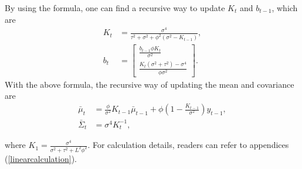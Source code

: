 By using the formula, one can find a recursive way to update $K_{t}$ and $b_{t-1}$, which are 
\begin{align}
K_{t}  &=\frac{\sigma^4}{\tau^2+\sigma^2+\phi^2(\sigma^2-K_{t-1})},\\
b_{t} &= \begin{bmatrix}
\frac{b_{t-1}\phi K_{t}}{\sigma^2} \\ \frac{K_{t}(\sigma^2+\tau^2)-\sigma^4 }{\phi\sigma^2}
\end{bmatrix}. 
\end{align}
With the above formula, the recursive way of updating the mean and covariance are 
\begin{align}
\bar{\mu}_{t}       & = \frac{\phi}{\sigma^2}K_{t-1}\bar{\mu}_{t-1} + \phi (1 - \frac{K_{t-1}}{\sigma^2})y_{t-1}, \\
\bar{\Sigma}_{t}  &= \sigma^4K_{t}^{-1},
\end{align}

where $K_1=\frac{\sigma^4}{\sigma^2+\tau^2+L^2\phi^2}$. For calculation details, readers can refer to appendices (\ref{linearcalculation}). 




